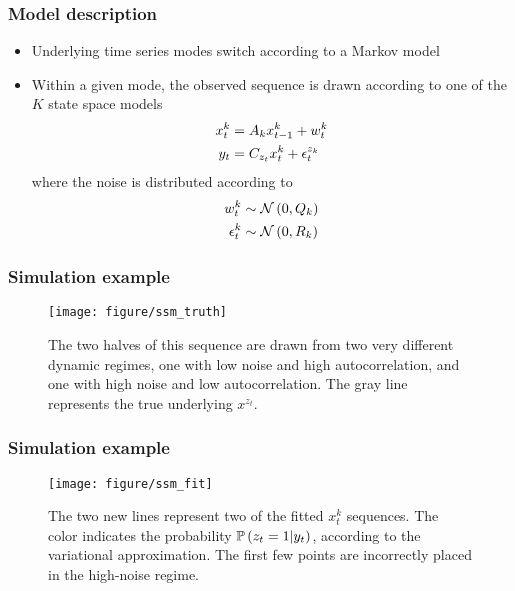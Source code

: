 \documentclass{beamer}
\begin{document}
\begin{frame}
  \frametitle{Model description}
\begin{itemize}
\item Underlying time series modes switch according to a Markov model
\item Within a given mode, the observed sequence is drawn according to one of
  the $K$ state space models
  \begin{align*}
    x^{k}_{t} &= A_{k}x_{t - 1}^{k} + w^{k}_{t} \\
    y_{t} &= C_{z_{t}}x_{t}^{k} + \epsilon_{t}^{z_{k}}
    \end{align*}
  where the noise is distributed according to
  \begin{align*}
    w^{k}_{t} &\sim \mathcal{N}\left(0, Q_{k}\right) \\
    \epsilon^{k}_{t} &\sim \mathcal{N}\left(0, R_{k}\right)
  \end{align*}
\end{itemize}
\end{frame}

\begin{frame}
  \frametitle{Simulation example}
\begin{figure}[ht]
  \centering
  \texttt{[image: figure/ssm\_truth]}
  \caption{The two halves of this sequence are drawn from two very different
    dynamic regimes, one with low noise and high autocorrelation, and one with
    high noise and low autocorrelation. The gray line represents the true
    underlying $x^{z_{t}}$. \label{fig:ssm_truth} }
\end{figure}
  
\end{frame}

\begin{frame}
  \frametitle{Simulation example}
\begin{figure}[ht]
  \centering
  \texttt{[image: figure/ssm\_fit]}
  \caption{The two new lines represent two of the fitted $x_{t}^{k}$ sequences.
    The color indicates the probability $\mathbb{P}\left({z_{t} = 1 \vert y_{t}}\right)$,
      according to the variational approximation. The first few points are
      incorrectly placed in the high-noise regime.\label{fig:ssm_truth} }
\end{figure}
\end{frame}
\end{document}
